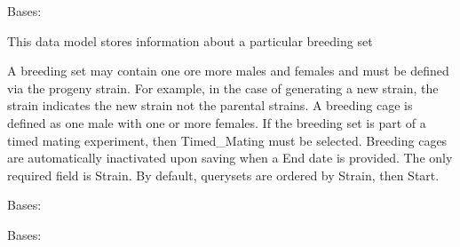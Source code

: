 \documentclass[letterpaper,10pt,english]{sphinxmanual}
\begin{document}
\begin{fulllineitems}
\label{api:mousedb.animal.models.Breeding}
Bases: 

This data model stores information about a particular breeding set

A breeding set may contain one ore more males and females and must be defined via the progeny strain.  For example, in the case of generating a new strain, the strain indicates the new strain not the parental strains.  A breeding cage is defined as one male with one or more females.  If the breeding set is part of a timed mating experiment, then Timed\_Mating must be selected.  Breeding cages are automatically inactivated upon saving when a End date is provided.  The only required field is Strain.  By default, querysets are ordered by Strain, then Start.


\begin{fulllineitems}
\label{api:mousedb.animal.models.Breeding.DoesNotExist}
Bases: 

\end{fulllineitems}



\begin{fulllineitems}
\label{api:mousedb.animal.models.Breeding.Females}
\end{fulllineitems}



\begin{fulllineitems}
\label{api:mousedb.animal.models.Breeding.Male}
\end{fulllineitems}



\begin{fulllineitems}
\label{api:mousedb.animal.models.Breeding.MultipleObjectsReturned}
Bases: 


\end{fulllineitems}
\end{fulllineitems}
\end{document}
